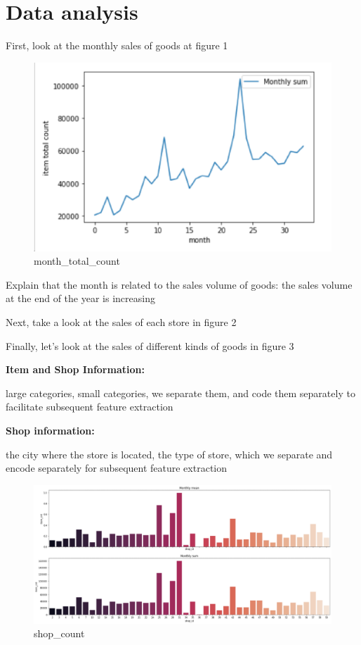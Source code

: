 \section{Data analysis}
First, look at the monthly sales of goods at figure 1\par
    \begin{figure}
        \includegraphics[scale=0.3]{picture/data_20.eps}
        \caption{month_total_count}\label{fig:1}
    \end{figure}
    Explain that the month is related to the sales volume of goods: the sales volume at the end of the year is increasing\par
    Next, take a look at the sales of each store in figure 2\par
    Finally, let's look at the sales of different kinds of goods in figure 3\par
    \textbf{Item and Shop Information:}\par
    large categories, small categories, we separate them, and code them separately to facilitate subsequent feature extraction\par
    \textbf{Shop information:}\par
    the city where the store is located, the type of store, which we separate and encode separately for subsequent feature extraction\par
    \begin{figure}[b]
        \includegraphics[scale=0.3]{picture/data_30.eps}
        \caption{shop_count}\label{fig:2}
    \end{figure}
